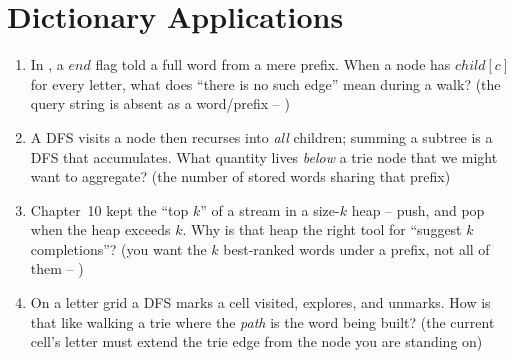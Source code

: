 \section{Dictionary Applications}\label{sec:c08-applications}

\begin{previouslybox}
\begin{enumerate}[nosep, leftmargin=1.6em]
  \item In , a $\mathit{end}$ flag told a full word from a mere prefix. When a
        node has $\mathit{child}[c]$ for every letter, what does ``there is no such edge'' mean during a
        walk? (the query string is absent as a word/prefix -- )
  \item A DFS visits a node then recurses into \emph{all} children; summing a subtree is a DFS that
        accumulates. What quantity lives \emph{below} a trie node that we might want to aggregate? (the
        number of stored words sharing that prefix)
  \item Chapter~10 kept the ``top $k$'' of a stream in a size-$k$ heap -- push, and pop when the heap
        exceeds $k$. Why is that heap the right tool for ``suggest $k$ completions''? (you want the $k$
        best-ranked words under a prefix, not all of them -- )
  \item On a letter grid a DFS marks a cell visited, explores, and unmarks. How is that like walking a
        trie where the \emph{path} is the word being built? (the current cell's letter must extend the
        trie edge from the node you are standing on)
\end{enumerate}
\end{previouslybox}

